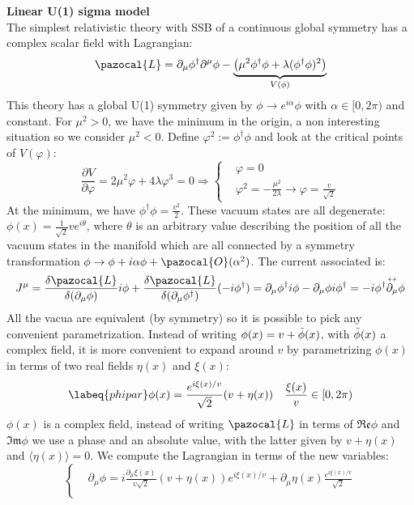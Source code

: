 \documentclass[../main.tex]{subfiles}
\begin{document}
\begin{example}
\textbf{Linear U(1) sigma model}\\
The simplest relativistic theory with SSB of a continuous global symmetry has a complex scalar field with Lagrangian:
\[
\pazocal{L}=\partial_\mu\phi^\dagger\partial^\mu\phi-\underbrace{\left(\mu^2\phi^\dagger\phi+\lambda(\phi^\dagger\phi)^2\right)}_{V(\phi)}
\]
This theory has a global U(1) symmetry given by $\phi\to e^{i\alpha}\phi$ with $\alpha\in[0,2\pi)$ and constant. For $\mu^2>0$, we have the minimum in the origin, a non interesting situation so we consider $\mu^2<0$. Define $\varphi^2:=\phi^\dagger\phi$ and look at the critical points of $V(\varphi)$:
\[
\frac{\partial V}{\partial\varphi}=2\mu^2\varphi+4\lambda\varphi^3=0\Rightarrow
\left\{
\begin{aligned}
&\varphi=0\\
&\varphi^2=-\frac{\mu^2}{2\lambda}\to\varphi=\frac{v}{\sqrt{2}}
\end{aligned}
\right.
\]
At the minimum, we have $\phi^\dagger\phi=\frac{v^2}{2}$. These vacuum states are all degenerate: $\phi(x)=\frac{1}{\sqrt{2}}ve^{i\theta}$, where $\theta$ is an arbitrary value describing the position of all the vacuum states in the manifold which are all connected by a symmetry transformation $\phi\to\phi+i\alpha\phi+\pazocal{O}(\alpha^2)$. The current associated is:
\[
J^\mu=\frac{\delta\pazocal{L}}{\delta(\partial_\mu\phi)}i\phi+\frac{\delta\pazocal{L}}{\delta(\partial_\mu\phi^\dagger)}(-i\phi^\dagger)=\partial_\mu\phi^\dagger i\phi-\partial_\mu\phi i\phi^\dagger=-i\phi^\dagger\overset{\leftrightarrow}{\partial_\mu}\phi
\]
All the vacua are equivalent (by symmetry) so it is possible to pick any convenient parametrization. Instead of writing $\phi(x)=v+\Tilde{\phi}(x)$, with $\Tilde{\phi}(x)$ a complex field, it is more convenient to expand around $v$ by parametrizing $\phi(x)$ in terms of two real fields $\eta(x)$ and $\xi(x)$:
\begin{equation}
\labeq{phipar}
\phi(x)=\frac{e^{i\xi(x)/v}}{\sqrt{2}}(v+\eta(x)) \quad \frac{\xi(x)}{v}\in[0,2\pi)
\end{equation}
$\phi(x)$ is a complex field, instead of writing $\pazocal{L}$ in terms of $\mathfrak{Re}\phi$ and $\mathfrak{Im}\phi$ we use a phase and an absolute value, with the latter given by $v+\eta(x)$ and $\langle\eta(x)\rangle=0$. We compute the Lagrangian in terms of the new variables:
\[
\left\{
\begin{aligned}
&\partial_\mu\phi=i\frac{\partial_\mu\xi(x)}{v\sqrt{2}}(v+\eta(x))e^{i\xi(x)/v}+\partial_\mu\eta(x)\frac{e^{i\xi(x)/v}}{\sqrt{2}}\\

\end{aligned}\]
\end{example}
\end{document}
